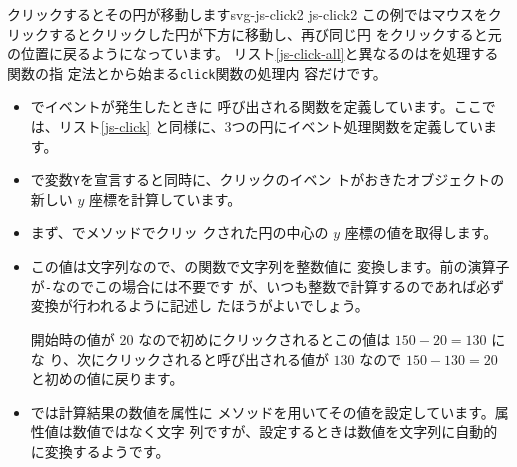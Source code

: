 {クリックするとその円が移動します}{svg-js-click2}
{}
{js-click2}
この例ではマウスをクリックするとクリックした円が下方に移動し、再び同じ円
をクリックすると元の位置に戻るようになっています。
リスト\ref{js-click-all}と異なるのはを処理する関数の指
定法とから始まる\texttt{click}関数の処理内
容だけです。
\begin{itemize}
 \item {}でイベントが発生したときに
       呼び出される関数を定義しています。ここでは、リスト\ref{js-click}
       と同様に、3つの円にイベント処理関数を定義しています。
 \item {}で変数\texttt{Y}を宣言すると同時に、クリックのイベン
       トがおきたオブジェクトの新しい $y$ 座標を計算しています。
 \item まず、でメソッドでクリッ
       クされた円の中心の $y$ 座標の値を取得します。
 \item この値は文字列なので、\JS の関数で文字列を整数値に
       変換します。前の演算子が\texttt{-}なのでこの場合には不要です
       が、いつも整数で計算するのであれば必ず変換が行われるように記述し
       たほうがよいでしょう。

開始時の値が $20$ なので初めにクリックされるとこの値は $150-20=130$ にな
       り、次にクリックされると呼び出される値が $130$ なので
       $150-130=20$ と初めの値に戻ります。
 \item {}では計算結果の数値を属性に
       メソッドを用いてその値を設定しています。属性値は数値ではなく文字
       列ですが、設定するときは数値を文字列に自動的に変換するようです。
\end{itemize}

